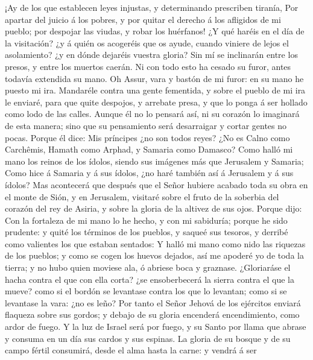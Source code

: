  ¡Ay de los que establecen leyes injustas, y determinando
prescriben tiranía,  Por apartar del juicio á los pobres,
y por quitar el derecho á los afligidos de mi pueblo; por despojar las
viudas, y robar los huérfanos!  ¿Y qué haréis en el día de
la visitación? ¿y á quién os acogeréis que os ayude, cuando viniere de
lejos el asolamiento? ¿y en dónde dejaréis vuestra gloria?
 Sin mí se inclinarán entre los presos, y entre los
muertos caerán. Ni con todo esto ha cesado su furor, antes todavía
extendida su mano.  Oh Assur, vara y bastón de mi furor:
en su mano he puesto mi ira.  Mandaréle contra una gente
fementida, y sobre el pueblo de mi ira le enviaré, para que quite
despojos, y arrebate presa, y que lo ponga á ser hollado como lodo de
las calles.  Aunque él no lo pensará así, ni su corazón lo
imaginará de esta manera; sino que su pensamiento será desarraigar y
cortar gentes no pocas.  Porque él dice: Mis príncipes ¿no
son todos reyes?  ¿No es Calno como Carchêmis, Hamath como
Arphad, y Samaria como Damasco?  Como halló mi mano los
reinos de los ídolos, siendo sus imágenes más que Jerusalem y Samaria;
 Como hice á Samaria y á sus ídolos, ¿no haré también así
á Jerusalem y á sus ídolos?  Mas acontecerá que después
que el Señor hubiere acabado toda su obra en el monte de Sión, y en
Jerusalem, visitaré sobre el fruto de la soberbia del corazón del rey de
Asiria, y sobre la gloria de la altivez de sus ojos. 
Porque dijo: Con la fortaleza de mi mano lo he hecho, y con mi
sabiduría; porque he sido prudente: y quité los términos de los pueblos,
y saqueé sus tesoros, y derribé como valientes los que estaban sentados:
 Y halló mi mano como nido las riquezas de los pueblos; y
como se cogen los huevos dejados, así me apoderé yo de toda la tierra; y
no hubo quien moviese ala, ó abriese boca y graznase. 
¿Gloriaráse el hacha contra el que con ella corta? ¿se ensoberbecerá la
sierra contra el que la mueve? como si el bordón se levantase contra los
que lo levantan; como si se levantase la vara: ¿no es leño?
 Por tanto el Señor Jehová de los ejércitos enviará
flaqueza sobre sus gordos; y debajo de su gloria encenderá
encendimiento, como ardor de fuego.  Y la luz de Israel
será por fuego, y su Santo por llama que abrase y consuma en un día sus
cardos y sus espinas.  La gloria de su bosque y de su
campo fértil consumirá, desde el alma hasta la carne: y vendrá á ser

